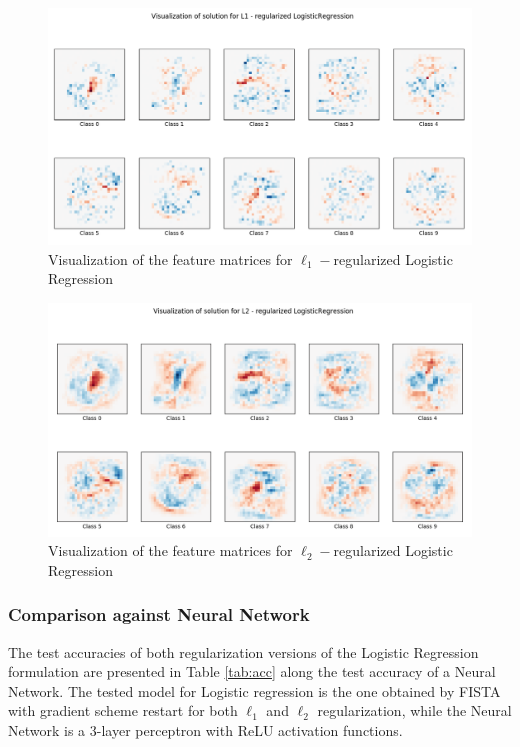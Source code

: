 \documentclass{article}
\begin{document}
\begin{figure}[H]
    \centering
        \includegraphics[trim={.5cm .5cm .5cm 2.5cm},clip, width=\textwidth]{img/visual_l1.png}
         \caption{Visualization of the feature matrices for $\ell_1-$regularized Logistic Regression}
    \label{fig:vis_1}
\end{figure}
\begin{figure}[H]
        \includegraphics[trim={.5cm .5cm .5cm 2.5cm},clip,width=\textwidth]{img/visual_l2.png}
    \caption{Visualization of the feature matrices for $\ell_2-$regularized Logistic Regression}
    \label{fig:vis_2}
\end{figure}

\subsubsection*{Comparison against Neural Network}
The test accuracies of both regularization versions of the Logistic Regression formulation are presented in Table \ref{tab:acc} along the test accuracy of a Neural Network. The tested model for Logistic regression is the one obtained by FISTA with gradient scheme restart for both $\ell_1$ and $\ell_2$ regularization, while the Neural Network is a 3-layer perceptron with ReLU activation functions.
\end{document}
